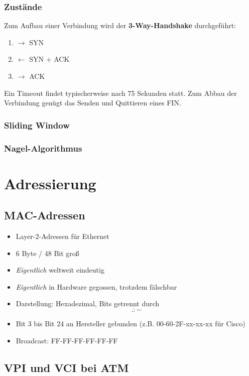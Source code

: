 \documentclass{article} %
\begin{document}
\subsubsection{Zustände}

Zum Aufbau einer Verbindung wird der \textbf{3-Way-Handshake} durchgeführt:
\begin{enumerate}
	\item $\rightarrow$ SYN
	\item $\leftarrow$ SYN + ACK
	\item $\rightarrow$ ACK
\end{enumerate}
Ein Timeout findet typischerweise nach 75 Sekunden statt. Zum Abbau der Verbindung genügt das Senden und Quittieren eines FIN.

\subsubsection{Sliding Window}
\subsubsection{Nagel-Algorithmus}
\section{Adressierung}

\subsection{MAC-Adressen}

\begin{itemize}
	\item Layer-2-Adressen für Ethernet
	\item 6 Byte / 48 Bit groß
	\item \emph{Eigentlich} weltweit eindeutig
	\item \emph{Eigentlich} in Hardware gegossen, trotzdem fälschbar
	\item Darstellung: Hexadezimal, Bits getrennt durch \[.:-\]
	\item Bit 3 bis Bit 24 an Hersteller gebunden (z.B. 00-60-2F-xx-xx-xx für Cisco)
	\item Broadcast: FF-FF-FF-FF-FF-FF 
\end{itemize}

\subsection{VPI und VCI bei ATM}
\end{document}
